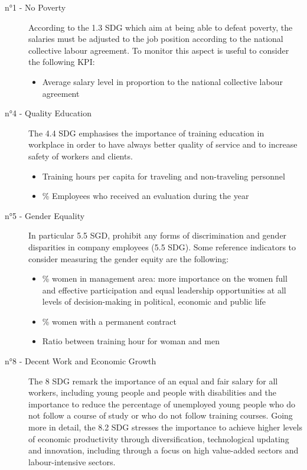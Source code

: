 \begin{description}
   \item[n°1 - No Poverty] According to the 1.3 SDG which aim at being able to defeat poverty, the salaries must be adjusted to the job position according to the national collective labour agreement. To monitor this aspect is useful to consider the following KPI:
   \begin{itemize}
       \item Average salary level in proportion to the national collective labour agreement
   \end{itemize}
   \item[n°4 - Quality Education ]The 4.4 SDG emphasises the importance of training education in workplace in order to have always better quality of service and to increase safety of workers and clients.
    \begin{itemize}
       \item Training hours per capita for traveling and non-traveling personnel
       \item \% Employees who received an evaluation during the year
   \end{itemize}
   \item[n°5 - Gender Equality ] In particular 5.5 SGD, prohibit any forms of discrimination and gender disparities in company employees (5.5 SDG). Some reference indicators to consider measuring the gender equity are the following:
   \begin{itemize}
       \item \% women in management area: more importance on the women full and effective participation and equal leadership opportunities at all levels of decision-making in political, economic and public life
       \item \% women with a permanent contract
       \item Ratio between training hour for woman and men
   \end{itemize}
   \item[n°8 - Decent Work and Economic Growth ] The 8 SDG remark the importance of an equal and fair salary for all workers, including young people and people with disabilities and the importance to reduce the percentage of unemployed young people who do not follow a course of study or who do not follow training courses. Going more in detail, the 8.2 SDG stresses the importance to achieve higher levels of economic productivity through diversification, technological updating and innovation, including through a focus on high value-added sectors and labour-intensive sectors. 

\end{description}
